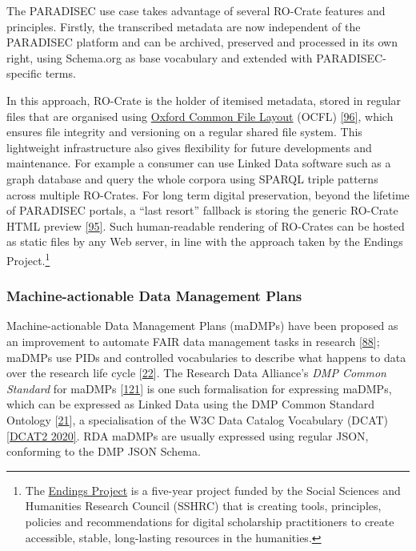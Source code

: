 The PARADISEC use case takes advantage of several RO-Crate features and
principles. Firstly, the transcribed metadata are now independent of the
PARADISEC platform and can be archived, preserved and processed in its
own right, using Schema.org as base vocabulary and extended with
PARADISEC-specific terms.

In this approach, RO-Crate is the holder of itemised metadata, stored in
regular files that are organised using
\href{https://ocfl.io/1.0/spec/}{Oxford Common File Layout} (OCFL)
\href{https://ocfl.io/1.0/spec/}{{[}96{]}}, which ensures file integrity
and versioning on a regular shared file system. This lightweight
infrastructure also gives flexibility for future developments and
maintenance. For example a consumer can use Linked Data software such as
a graph database and query the whole corpora using SPARQL triple
patterns across multiple RO-Crates. For long term digital preservation,
beyond the lifetime of PARADISEC portals, a ``last resort'' fallback is
storing the generic RO-Crate HTML preview
\href{https://www.npmjs.com/package/ro-crate-html-js}{{[}95{]}}. Such
human-readable rendering of RO-Crates can be hosted as static files by
any Web server, in line with the approach taken by the Endings
Project.\footnote{The \href{https://endings.uvic.ca/}{Endings Project}
  is a five-year project funded by the Social Sciences and Humanities
  Research Council (SSHRC) that is creating tools, principles, policies
  and recommendations for digital scholarship practitioners to create
  accessible, stable, long-lasting resources in the humanities.}

\hypertarget{dmp}{%
\subsubsection{Machine-actionable Data Management Plans}\label{dmp}}

Machine-actionable Data Management Plans (maDMPs) have been proposed as
an improvement to automate FAIR data management tasks in research
{[}\href{https://doi.org/10.1371/journal.pcbi.1006750}{88}{]}; maDMPs
use PIDs and controlled vocabularies to describe what happens to data
over the research life cycle
{[}\href{https://doi.org/10.1007/978-3-030-45442-5_15}{22}{]}. The
Research Data Alliance's \emph{DMP Common Standard} for maDMPs
{[}\href{https://doi.org/10.15497/rda00039}{121}{]} is one such
formalisation for expressing maDMPs, which can be expressed as Linked
Data using the DMP Common Standard Ontology
{[}\href{https://doi.org/10.4126/frl01-006423289}{21}{]}, a
specialisation of the W3C Data Catalog Vocabulary (DCAT)
\href{https://www.w3.org/TR/2020/REC-vocab-dcat-2-20200204/}{{[}DCAT2 2020{]}}.
RDA maDMPs are usually expressed using regular JSON, conforming to the
DMP JSON Schema.

